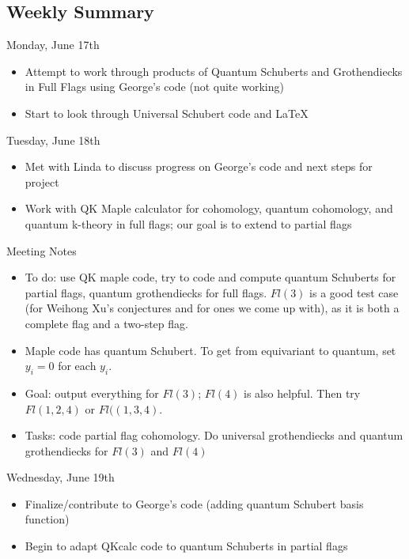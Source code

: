 \subsection{Weekly Summary}

Monday, June 17th
\begin{itemize}
    \item Attempt to work through products of Quantum Schuberts and Grothendiecks in Full Flags using George's code (not quite working)
    \item Start to look through Universal Schubert code and LaTeX
\end{itemize}

Tuesday, June 18th
\begin{itemize}
    \item Met with Linda to discuss progress on George's code and next steps for project
    \item Work with QK Maple calculator for cohomology, quantum cohomology, and quantum k-theory in full flags; our goal is to extend to partial flags
\end{itemize}

Meeting Notes
\begin{itemize}
    \item To do: use QK maple code, try to code and compute quantum Schuberts for partial flags, quantum grothendiecks for full flags. $Fl(3)$ is a good test case (for Weihong Xu's conjectures and for ones we come up with), as it is both a complete flag and a two-step flag. 
    \item Maple code has quantum Schubert. To get from equivariant to quantum, set $y_i = 0$ for each $y_i$.
    \item Goal: output everything for $Fl(3)$; $Fl(4)$ is also helpful. Then try $Fl(1,2,4)$ or $Fl((1,3,4)$.
    \item Tasks: code partial flag cohomology. Do universal grothendiecks and quantum grothendiecks for $Fl(3)$ and $Fl(4)$
\end{itemize}

Wednesday, June 19th
\begin{itemize}
    \item Finalize/contribute to George's code (adding quantum Schubert basis function)
    \item Begin to adapt QKcalc code to quantum Schuberts in partial flags
\end{itemize}